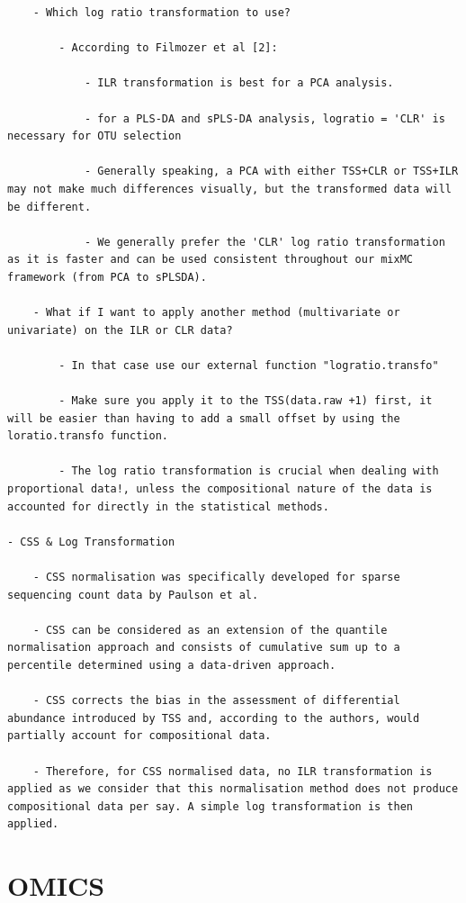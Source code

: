 \documentclass[
]{book}
\begin{document}
\begin{verbatim}
    - Which log ratio transformation to use?

        - According to Filmozer et al [2]:

            - ILR transformation is best for a PCA analysis.

            - for a PLS-DA and sPLS-DA analysis, logratio = 'CLR' is necessary for OTU selection

            - Generally speaking, a PCA with either TSS+CLR or TSS+ILR may not make much differences visually, but the transformed data will be different.

            - We generally prefer the 'CLR' log ratio transformation as it is faster and can be used consistent throughout our mixMC framework (from PCA to sPLSDA).

    - What if I want to apply another method (multivariate or univariate) on the ILR or CLR data?

        - In that case use our external function "logratio.transfo"

        - Make sure you apply it to the TSS(data.raw +1) first, it will be easier than having to add a small offset by using the loratio.transfo function.

        - The log ratio transformation is crucial when dealing with proportional data!, unless the compositional nature of the data is accounted for directly in the statistical methods.

- CSS & Log Transformation

    - CSS normalisation was specifically developed for sparse sequencing count data by Paulson et al.

    - CSS can be considered as an extension of the quantile normalisation approach and consists of cumulative sum up to a percentile determined using a data-driven approach.

    - CSS corrects the bias in the assessment of differential abundance introduced by TSS and, according to the authors, would partially account for compositional data.

    - Therefore, for CSS normalised data, no ILR transformation is applied as we consider that this normalisation method does not produce compositional data per say. A simple log transformation is then applied.
\end{verbatim}

\hypertarget{omics}{%
\section{OMICS}\label{omics}}
\end{document}

